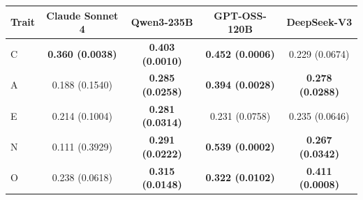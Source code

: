 \begin{tabular}{lcccc}
\toprule
Trait & Claude Sonnet 4 & Qwen3-235B & GPT-OSS-120B & DeepSeek-V3 \\
\midrule
C & \textbf{0.360 (0.0038)} & \textbf{0.403 (0.0010)} & \textbf{0.452 (0.0006)} & 0.229 (0.0674) \\
A & 0.188 (0.1540) & \textbf{0.285 (0.0258)} & \textbf{0.394 (0.0028)} & \textbf{0.278 (0.0288)} \\
E & 0.214 (0.1004) & \textbf{0.281 (0.0314)} & 0.231 (0.0758) & 0.235 (0.0646) \\
N & 0.111 (0.3929) & \textbf{0.291 (0.0222)} & \textbf{0.539 (0.0002)} & \textbf{0.267 (0.0342)} \\
O & 0.238 (0.0618) & \textbf{0.315 (0.0148)} & \textbf{0.322 (0.0102)} & \textbf{0.411 (0.0008)} \\
\bottomrule
\end{tabular}
